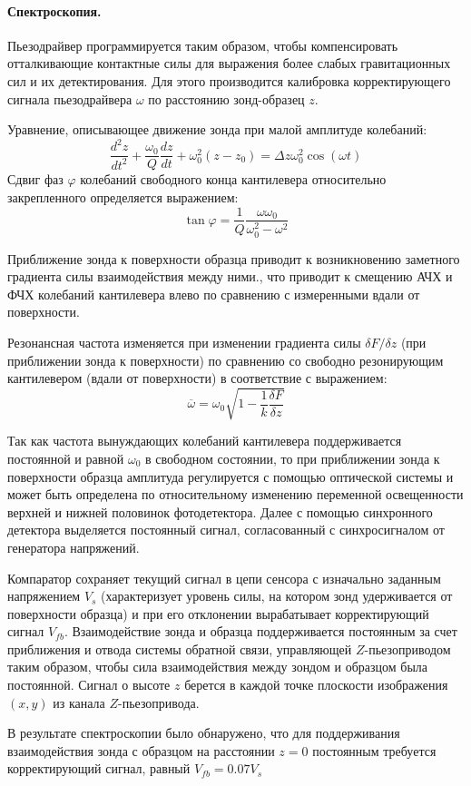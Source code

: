 \documentclass[a4paper, 12pt]{article}
\begin{document}
	\paragraph{Спектроскопия.} Пьезодрайвер программируется таким образом, чтобы компенсировать отталкивающие контактные силы для выражения более слабых гравитационных сил и их детектирования. Для этого производится калибровка корректирующего сигнала пьезодрайвера $\omega$ по расстоянию зонд-образец $z$.\par
	Уравнение, описывающее движение зонда при малой амплитуде колебаний:
	\begin{equation*}
		\frac{d^2z}{dt^2}+\frac{\omega_0}{Q}\frac{dz}{dt}+\omega_0^2(z-z_0)=\Delta z\omega_0^2\cos(\omega t)
	\end{equation*}
	Сдвиг фаз $\varphi$ колебаний свободного конца кантилевера относительно закрепленного определяется выражением:
	\begin{equation*}
		\tan\varphi=\frac{1}{Q}\frac{\omega\omega_0}{\omega_0^2-\omega^2}
	\end{equation*}
	\par
	Приближение зонда к поверхности образца приводит к возникновению заметного градиента силы взаимодействия между ними., что приводит к смещению АЧХ и ФЧХ колебаний кантилевера влево по сравнению с измеренными вдали от поверхности.\par
	Резонансная частота изменяется при изменении градиента силы $\delta F/\delta z$ (при приближении зонда к поверхности) по сравнению со свободно резонирующим кантилевером (вдали от поверхности) в соответствие с выражением:
	\begin{equation*}
		\overline{\omega}=\omega_0\sqrt{1-\frac{1}{k}\frac{\delta F}{\delta z}}
	\end{equation*}
	\par
	Так как частота вынуждающих колебаний кантилевера поддерживается постоянной и равной $\omega_0$ в свободном состоянии, то при приближении зонда к поверхности образца амплитуда регулируется с помощью оптической системы и может быть определена по относительному изменению переменной освещенности верхней и нижней половинок фотодетектора. Далее с помощью синхронного детектора выделяется постоянный сигнал, согласованный с синхросигналом от генератора напряжений.\par
	Компаратор сохраняет текущий сигнал в цепи сенсора с изначально заданным напряжением $V_s$ (характеризует уровень силы, на котором зонд удерживается от поверхности образца) и при его отклонении вырабатывает корректирующий сигнал $V_{fb}$. Взаимодействие зонда и образца поддерживается постоянным за счет приближения и отвода системы обратной связи, управляющей $Z$-пьезоприводом таким образом, чтобы сила взаимодействия между зондом и образцом была постоянной. Сигнал о высоте $z$ берется в каждой точке плоскости изображения $(x,y)$ из канала $Z$-пьезопривода.\par
	В результате спектроскопии было обнаружено, что для поддерживания взаимодействия зонда с образцом на расстоянии $z = 0$ постоянным требуется корректирующий сигнал, равный $V_{fb}=0.07 V_s$
\end{document}
